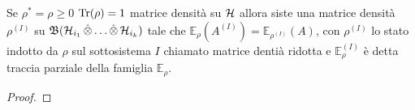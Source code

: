 \begin{theorem}
    Se $\rho^* = \rho \geq 0$ $\Tr(\rho) = 1$ matrice densità su $\operatorname{\mathcal{H}}$ allora siste una matrice densità $\rho^{(I)}$ su $\mathfrak{B}(\operatorname{\mathcal{H}}_{i_1}\operatorname{\hat{\otimes}} \dots \operatorname{\hat{\otimes}} \operatorname{\mathcal{H}}_{i_k})$ tale che $\mathbb{E}_\rho(A^{(I)}) = \mathbb{E}_{\rho^{(I)}}(A)$, con $\rho^{(I)}$ lo stato indotto da $\rho$ sul sottosistema $I$ chiamato matrice dentià ridotta e $\mathbb{E}_\rho^{(I)}$ è detta traccia parziale della famiglia $\mathbb{E}_\rho$.
\end{theorem}

\begin{proof}
\end{proof}


